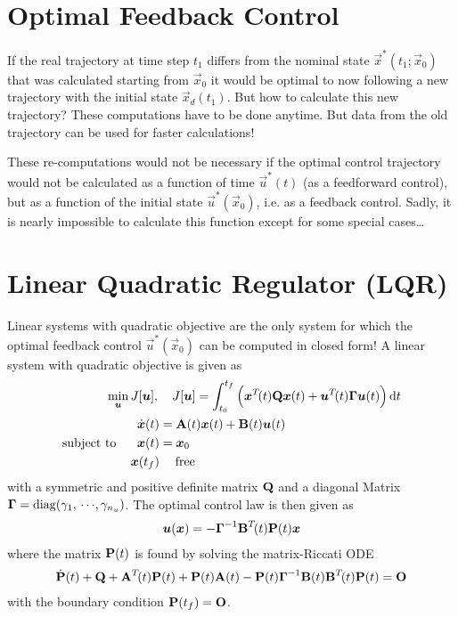 	\section{Optimal Feedback Control}
		If the real trajectory at time step \( t_1 \) differs from the nominal state \( \vec{x}^\ast(t_1; \vec{x}_0) \) that was calculated starting from \( \vec{x}_0 \) it would be optimal to now following a new trajectory with the initial state \( \vec{x}_d(t_1) \). But how to calculate this new trajectory? These computations have to be done anytime. But data from the old trajectory can be used for faster calculations!

		These re-computations would not be necessary if the optimal control trajectory would not be calculated as a function of time \( \vec{u}^\ast(t) \) (as a feedforward control), but as a function of the initial state \( \vec{u}^\ast(\vec{x}_0) \), i.e. as a feedback control. Sadly, it is nearly impossible to calculate this function except for some special cases\dots

	\section{Linear Quadratic Regulator (LQR)}
		Linear systems with quadratic objective are the only system for which the optimal feedback control \( \vec{u}^\ast(\vec{x}_0) \) can be computed in closed form! A linear system with quadratic objective is given as
		\begin{align*}
			\min_{\bm{u}}           & \, J[\bm{u}],\quad J[\bm{u}] = \int_{t_0}^{t_f} \Big( \bm{x}^T\!(t) \bm{\mathrm{Q}} \bm{x}(t) + \bm{u}^T\!(t) \bm{\mathrm{\Gamma}} \bm{u}(t) \Big) \dd{t} \\
			\mathrm{subject~to}\quad & \,
			\begin{alignedat}{2}
				\dot{\bm{x}}(t) &= \bm{\mathrm{A}}(t) \bm{x}(t) + \bm{\mathrm{B}}(t) \bm{u}(t) \\
				\bm{x}(t) &= \bm{x}_0 \\
				\bm{x}(t_f) &\phantom{=}\,\,\, \text{free}
			\end{alignedat}
		\end{align*}
		with a symmetric and positive definite matrix \( \bm{\mathrm{Q}} \) and a diagonal Matrix \( \bm{\mathrm{\Gamma}} = \operatorname{diag}(\gamma_1,\,\cdots\!,\gamma_{n_u}) \). The optimal control law is then given as
		\begin{align*}
			\bm{u}(\bm{x}) = -\bm{\mathrm{\Gamma}}^{-1} \bm{\mathrm{B}}^T\!(t) \bm{\mathrm{P}}(t) \bm{x}
		\end{align*}
		where the matrix \( \bm{\mathrm{P}}(t) \) is found by solving the matrix-Riccati ODE
		\begin{align*}
			\dot{\bm{\mathrm{P}}}(t) + \bm{\mathrm{Q}} + \bm{\mathrm{A}}^T\!(t) \bm{\mathrm{P}}(t) + \bm{\mathrm{P}}(t) \bm{\mathrm{A}}(t) - \bm{\mathrm{P}}(t) \bm{\mathrm{\Gamma}}^{-1} \bm{\mathrm{B}}(t) \bm{\mathrm{B}}^T\!(t) \bm{\mathrm{P}}(t) = \bm{\mathrm{O}}
		\end{align*}
		with the boundary condition \( \bm{\mathrm{P}}(t_f) = \bm{\mathrm{O}} \).

